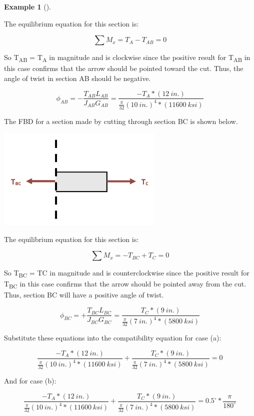 \documentclass[
  letterpaper,
  DIV=11,
  numbers=noendperiod]{scrreprt}
\theoremstyle{definition}
\newtheorem{example}{Example}[chapter]
\theoremstyle{remark}
\begin{document}
\begin{tcolorbox}
\begin{example}[]
\begin{tcolorbox}
The equilibrium equation for this section is:

\[
\sum M_x=T_A-T_{A B}=0
\]

So T\textsubscript{AB} = T\textsubscript{A} in magnitude and is
clockwise since the positive result for T\textsubscript{AB} in this case
confirms that the arrow should be pointed toward the cut. Thus, the
angle of twist in section AB should be negative.

\[
\phi_{AB}=-\frac{T_{AB}L_{AB}}{J_{AB}G_{AB}}=\frac{-T_A*(12{~in.})}{\frac{\pi}{32}(10{~in.})^4*(11600{~ksi})}
\]

The FBD for a section made by cutting through section BC is shown below.

\begin{center}
\includegraphics[width=3.125in,height=\textheight]{images/CH6 PNGs/example 6.4 part 5.png}
\end{center}

The equilibrium equation for this section is:

\[
\sum M_x=-T_{B C}+T_C=0
\]

So T\textsubscript{BC} = TC in magnitude and is counterclockwise since
the positive result for T\textsubscript{BC} in this case confirms that
the arrow should be pointed away from the cut. Thus, section BC will
have a positive angle of twist.

\[
\phi_{B C}=+\frac{T_{BC}L_{BC}}{J_{BC}G_{BC}}=\frac{T_C*(9{~in.})}{\frac{\pi}{32}(7{~in.})^4*(5800{~ksi})}
\]

Substitute these equations into the compatibility equation for case (a):

\[
\frac{-T_A*(12{~in.})}{\frac{\pi}{32}(10{~in.})^4*(11600{~ksi})}+\frac{T_C*(9 {~in.})}{\frac{\pi}{32}(7{~in.})^4*(5800{~ksi})}=0
\]

And for case (b):

\[
\frac{-T_A*(12{~in.})}{\frac{\pi}{32}(10{~in.})^4*(11600{~ksi})}+\frac{T_C*(9 {~in.})}{\frac{\pi}{32}(7{~in.})^4*(5800{~ksi})}=0.5^{\circ}*\frac{\pi}{180^{\circ}}
\]


\end{tcolorbox}
\end{example}
\end{tcolorbox}
\end{document}
